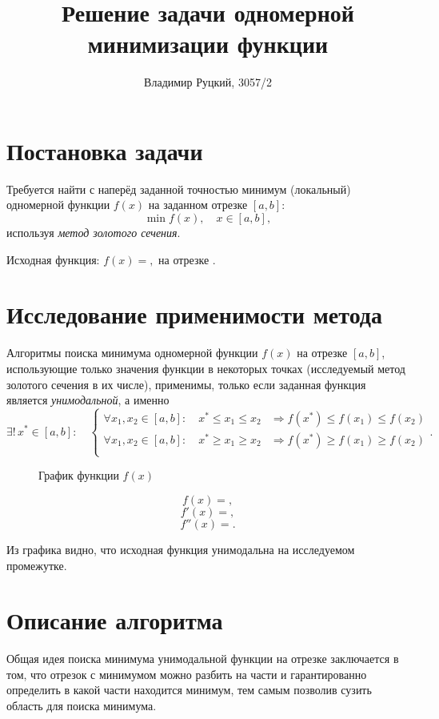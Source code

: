 \documentclass[10pt,a4paper,titlepage]{article}
\title{Решение задачи одномерной минимизации функции}
\author{Владимир Руцкий, 3057/2}
\date{}
\begin{document}
\maketitle
\thispagestyle{empty}

\section{Постановка задачи}
Требуется найти с наперёд заданной точностью минимум (локальный) одномерной функции $f(x)$ на заданном отрезке $[a, b]$:
$$ \min f(x), \quad x \in [a, b], $$
используя \textit{метод золотого сечения}.

Исходная функция: $f(x) = ,$ на отрезке $.$

\section{Исследование применимости метода}
Алгоритмы поиска минимума одномерной функции $f(x)$ на отрезке $[a, b]$, 
использующие только значения функции в некоторых точках 
(исследуемый метод золотого сечения в их числе), применимы, только
если заданная функция является \textit{унимодальной}, а именно
$$ \exists ! \, x^* \in [a, b]: \quad
\begin{cases}
  \forall x_1, x_2 \in [a,b]: \quad x^* \leqslant x_1 \leqslant x_2 & \Rightarrow f(x^*) \leqslant f(x_1) \leqslant f(x_2) \\
  \forall x_1, x_2 \in [a,b]: \quad x^* \geqslant x_1 \geqslant x_2 & \Rightarrow f(x^*) \geqslant f(x_1) \geqslant f(x_2) \\
\end{cases}.
$$

\begin{figure}[h]
  \label{function-graph}
  \caption{График функции $f(x)$}
  \begin{center}
  
  \end{center}
\end{figure}

$$f(x) = ,$$
$$f'(x) = ,$$
$$f''(x) = .$$

Из графика видно, что исходная функция унимодальна на исследуемом промежутке.

\section{Описание алгоритма}
Общая идея поиска минимума унимодальной функции на отрезке заключается в том, 
что отрезок с минимумом можно разбить на части и гарантированно определить в какой части находится минимум,
тем самым позволив сузить область для поиска минимума.
\end{document}
